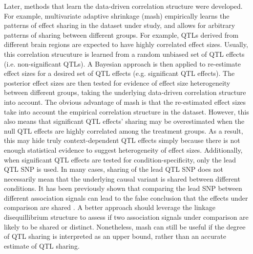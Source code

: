 Later, methods that learn the data-driven correlation structure were developed. For example, multivariate adaptive shrinkage (mash) empirically learns the patterns of effect sharing in the dataset under study, and allows for arbitrary patterns of sharing between different groups. For example, QTLs derived from different brain regions are expected to have highly correlated effect sizes. Usually, this correlation strucuture is learned from a random unbiased set of QTL effects (i.e. non-significant QTLs). A Bayesian approach is then applied to re-estimate effect sizes for a desired set of QTL effects (e.g. significant QTL effects). The posterior effect sizes are then tested for evidence of effect size heterogeneity between different groups, taking the underlying data-driven correlation structure into account. The obvious advantage of mash is that the re-estimated effect sizes take into account the empirical correlation structure in the dataset. However, this also means that significant QTL effects' sharing may be overestimated when the null QTL effects are highly correlated among the treatment groups. As a result, this may hide truly context-dependent QTL effects simply because there is not enough statistical evidence to suggest heterogeneity of effect sizes. Additionally, when significant QTL effects are tested for condition-specificity, only the lead QTL SNP is used. In many cases, sharing of the lead QTL SNP does not necessarily mean that the underlying causal variant is shared between different conditions. It has been previously shown that comparing the lead SNP between different association signals can lead to the false conclusion that the effects under comparison are shared \cite{Liu2019-fv}. A better approach should leverage the linkage disequillibrium structure to assess if two association signals under comparison are likely to be shared or distinct. Nonetheless, mash can still be useful if the degree of QTL sharing is interpreted as an upper bound, rather than an accurate estimate of QTL sharing.\\


